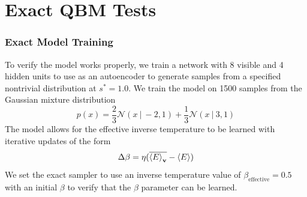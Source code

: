 \documentclass{beamer}
\begin{document}


\section{Exact QBM Tests}
\begin{frame}
    \frametitle{Exact Model Training}
    To verify the model works properly, we train a network with 8 visible and 4 hidden units to use as an autoencoder to generate samples from a specified nontrivial distribution at \( s^* = 1.0 \).
    We train the model on 1500 samples from the Gaussian mixture distribution
    \[
        p(x) = \frac{2}{3} \mathcal{N}(x \ | \ -2, 1) + \frac{1}{3} \mathcal{N}(x \ | \ 3, 1)
    \]
    The model allows for the effective inverse temperature to be learned with iterative updates of the form
    \[
        \Delta\beta = \eta (\overline{\braket{E}_{\mathbf{v}}} - \braket{E})
    \]
    We set the exact sampler to use an inverse temperature value of \( \beta_{\text{effective}} = 0.5 \) with an initial \( \beta \) to verify that the \( \beta \) parameter can be learned.
\end{frame}
\end{document}
